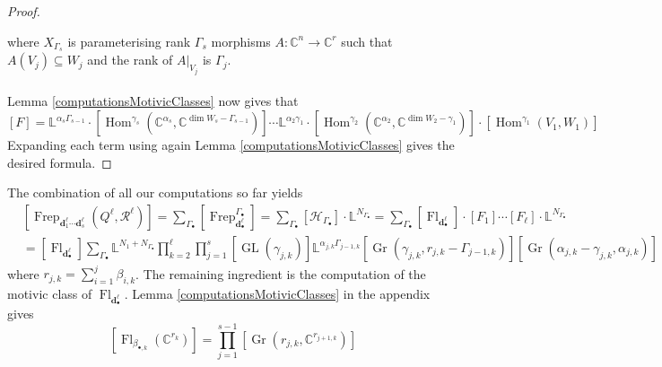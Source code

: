 \documentclass{amsart}
\theoremstyle{plain}
\numberwithin{equation}{section}
\theoremstyle{definition}
\theoremstyle{remark}
\begin{document}
\begin{proof}
\begin{center}
		\end{center}
		where $X_{\Gamma_s}$ is parameterising rank $\Gamma_s$ morphisms $A:\mathbb{C}^{n}\to \mathbb{C}^{r}$ such that $A(V_{j})\subseteq W_{j}$ and the rank of $A|_{V_{j}}$ is $\Gamma_j$.
		\\
		\\
		Lemma \ref{computationsMotivicClasses} now gives that 
		$$
		[F]= \mathbb{L}^{\alpha_s\Gamma_{s-1}}\cdot[\operatorname{Hom}^{\gamma_s}(\mathbb{C}^{\alpha_s},\mathbb{C}^{\dim W_s-\Gamma_{s-1}})]\cdots \mathbb{L}^{\alpha_2\gamma_1}\cdot [\operatorname{Hom}^{\gamma_2}(\mathbb{C}^{\alpha_2},\mathbb{C}^{\dim W_2 - \gamma_1})]\cdot [\operatorname{Hom}^{\gamma_1}(V_1,W_1)]
		$$
		Expanding each term using again Lemma \ref{computationsMotivicClasses} gives the desired formula. 
	\end{proof}
	The combination of all our computations so far yields
	\begin{align*}
		&[\operatorname{Frep}_{\mathbf d^\ell_1\cdots\mathbf d^\ell_s}
		(Q^\ell,\mathcal R^\ell)]=\sum_{\Gamma_\bullet}[\operatorname{Frep}^{\Gamma_\bullet}_{\mathbf{d}^\ell_\bullet}]=\sum_{\Gamma_\bullet}[\mathcal{H}_{\Gamma_\bullet}]\cdot\mathbb L^{N_{\Gamma_\bullet}}=\sum_{\Gamma_\bullet}[\operatorname{Fl}_{\mathbf{d}^\ell_\bullet }]\cdot [F_1]\cdots[F_\ell]\cdot \mathbb{L}^{N_{\Gamma_\bullet}}\\
		&=[\operatorname{Fl}_{\mathbf{d}_\bullet^\ell}]\sum_{\Gamma_\bullet} \mathbb{L}^{N_1+N_{\Gamma_\bullet}}\prod_{k=2}^\ell\prod_{j=1}^{s} [\operatorname{GL}(\gamma_{j,k})]\mathbb{L}^{\alpha_{j,k}\Gamma_{j-1,k}}[\operatorname{Gr}(\gamma_{j,k},r_{j,k}-\Gamma_{j-1,k})][\operatorname{Gr}(\alpha_{j,k}-\gamma_{j,k},\alpha_{j,k})]
	\end{align*}
	where $r_{j,k}=\sum_{i=1}^j\beta_{i,k}$. The remaining ingredient is the computation of the motivic class of $\operatorname{Fl}_{\mathbf{d}_\bullet^\ell}$. Lemma \ref{computationsMotivicClasses} in the appendix gives 
	$$
	[\operatorname{Fl}_{\beta_{\bullet,k}}(\mathbb C^{r_k})]=\prod_{j=1}^{s-1}[\operatorname{Gr}(r_{j,k},\mathbb{C}^{r_{j+1,k}})]
	$$
\end{document}
